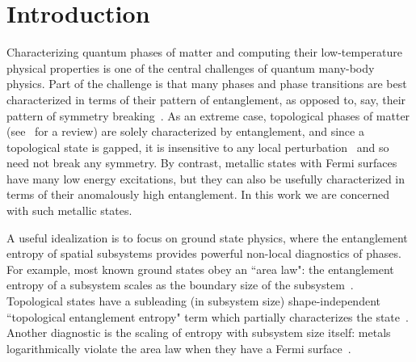 \documentclass[aps,pra,reprint,superscriptaddress,floatfix,amsmath,amssymb,amsfonts]{revtex4-1}
\begin{document}

\maketitle

\section{Introduction}
Characterizing quantum phases of matter and computing their low-temperature physical properties is one of the central challenges of quantum many-body physics. Part of the challenge is that many phases and phase transitions are best characterized in terms of their pattern of entanglement, as opposed to, say, their pattern of symmetry breaking~\cite{landau1937phasetransitions}. As an extreme case, topological phases of matter (see~\cite{wen2012toporeview} for a review) are solely characterized by entanglement, and since a topological state is gapped, it is insensitive to any local perturbation~\cite{hastings2005topostable,bravyi2010topostable} and so need not break any symmetry. By contrast, metallic states with Fermi surfaces have many low energy excitations, but they can also be usefully characterized in terms of their anomalously high entanglement. In this work we are concerned with such metallic states.

A useful idealization is to focus on ground state physics, where the entanglement entropy of spatial subsystems provides powerful non-local diagnostics of phases.
For example, most known ground states obey an ``area law": the entanglement entropy of a subsystem scales as the boundary size of the subsystem~\cite{eisert2010colloquium}.
Topological states have a subleading (in subsystem size) shape-independent ``topological entanglement entropy" term which partially characterizes the state~\cite{kitaev2006tee,levin2006tee}.
Another diagnostic is the scaling of entropy with subsystem size itself: metals logarithmically violate the area law when they have a Fermi surface~\cite{wolf2006violation,gioev2006entanglement,swingle2010entanglement}.
\end{document}
